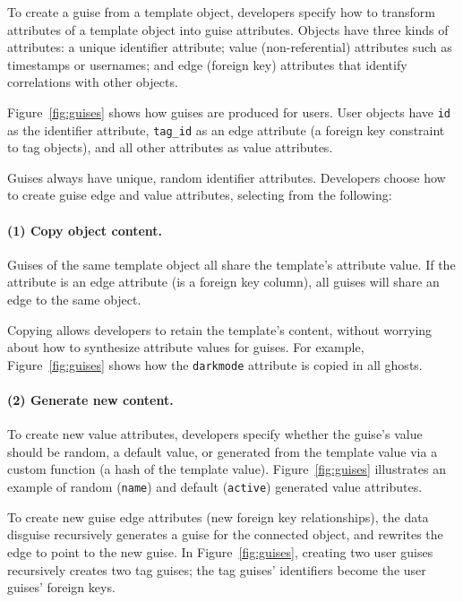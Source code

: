 To create a guise from a template object, developers specify how to transform attributes of a template
object into guise attributes.
%
Objects have three kinds of attributes: a unique identifier attribute; value
(non-referential) attributes such as timestamps or usernames; and edge (\eg foreign key)
attributes that identify correlations with other objects.
%

%
Figure~\ref{fig:guises} shows how guises are produced for users. User objects have \texttt{id} as
the identifier attribute,
\texttt{tag\_id} as an edge attribute (a foreign key constraint to tag objects),
and all other attributes as value attributes.

Guises always have unique, random identifier attributes.
Developers choose how to create guise edge and value attributes, selecting from the following:

\paragraph{(1) Copy object content.} Guises of the same template object all share the template's
    attribute value. If the attribute is an edge attribute (\eg is a foreign key column),
    all guises will share an edge to the same object.

    Copying allows developers to retain the template's content, without worrying about how to
    synthesize attribute values for guises.
    For example, Figure~\ref{fig:guises} shows how the \texttt{darkmode} attribute is copied in
    all ghosts.

\paragraph{(2) Generate new content.}
        To create new value attributes, developers specify whether the guise's value should be random,
        a default value, or generated from the template value via a custom function (\eg a hash of
        the template value). Figure~\ref{fig:guises} illustrates
        an example of random (\texttt{name}) and default (\texttt{active}) generated value attributes.

        To create new guise edge attributes (\eg new foreign key relationships), the data disguise
        recursively generates a guise for the connected object, and rewrites the edge to point to
        the new guise.  In Figure~\ref{fig:guises}, creating two user guises recursively creates two
        tag guises; the tag guises' identifiers become the user guises' foreign keys.

